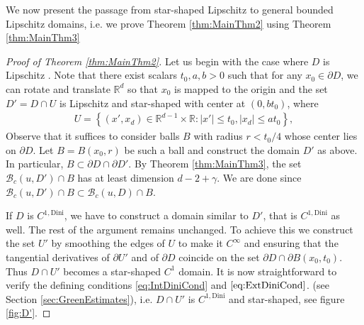 \documentclass[a4paper,12pt]{article}
\theoremstyle{definition}
\theoremstyle{definition}
\begin{document}
	We now present the passage from star-shaped Lipschitz to general bounded Lipschitz domains, i.e. we prove Theorem \ref{thm:MainThm2} using Theorem \ref{thm:MainThm3} 
	\begin{proof}[Proof of Theorem \ref{thm:MainThm2}]
		Let us begin with the case where $D$ is Lipschitz . Note that there exist scalars $t_0,a,b>0$ such that for any $x_0\in\partial D$, we can rotate and translate $\mathbb R^d$ so that $x_0$ is mapped to the origin and the set $D'=D\cap U$ is Lipschitz and star-shaped with center at $(0,bt_0)$, where 
		\begin{align*}
			U=\left\lbrace(x',x_d)\in\mathbb R^{d-1}\times\mathbb R:|x'|\leq t_0,|x_d|\leq at_0\right\rbrace,
		\end{align*}
		Observe that it suffices to consider balls $B$ with radius $r<t_0/4$ whose center lies on $\partial D$. Let $B=B(x_0,r)$ be such a ball and construct the domain $D'$ as above. In particular, $B\subset\partial D\cap\partial D'$. By Theorem \ref{thm:MainThm3}, the set $\mathcal{B}_c(u, D')\cap B$ has at least dimension $d-2+\gamma$. We are done since $\mathcal{B}_c(u, D')\cap B\subset \mathcal{B}_c(u, D)\cap B$.\par
		If $D$ is $C^{1,\mathrm{Dini}}$, we have to construct a domain similar to $D'$, that is $C^{1,\mathrm{Dini}}$ as well. The rest of the argument remains unchanged.  To achieve this we construct the set $U'$ by smoothing the edges of $U$ to make it $C^\infty$ and ensuring that the tangential derivatives of $\partial U'$ and of $\partial D$ coincide on the set $\partial D\cap \partial B(x_0,t_0)$. Thus $D\cap U'$ becomes a star-shaped $C^1$ domain. It is now straightforward to verify the defining conditions \eqref{eq:IntDiniCond} and $\eqref{eq:ExtDiniCond}$. (see Section \ref{sec:GreenEstimates}), i.e. $D\cap U'$ is $C^{1,\mathrm{Dini}}$ and star-shaped, see figure \ref{fig:D'}.
	\end{proof}	
\end{document}
